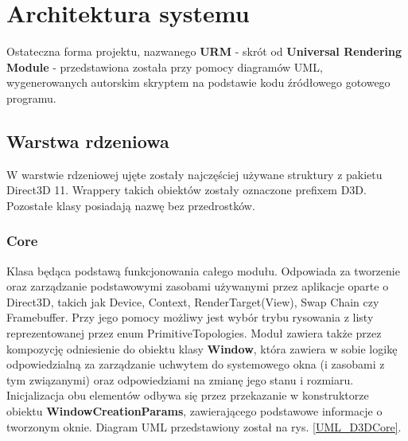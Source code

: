 \chapter{Architektura systemu}
\label{chapter_System_Architecture}
	Ostateczna forma projektu, nazwanego \textbf{URM} - skrót od \textbf{Universal Rendering Module} - przedstawiona została przy pomocy diagramów UML, wygenerowanych autorskim skryptem na podstawie kodu źródłowego gotowego programu.

\section{Warstwa rdzeniowa}
	W warstwie rdzeniowej ujęte zostały najczęściej używane struktury z pakietu Direct3D 11. Wrappery takich obiektów zostały oznaczone prefixem D3D. Pozostałe klasy posiadają nazwę bez przedrostków.

\subsection{Core}
	Klasa będąca podstawą funkcjonowania całego modułu. 
	Odpowiada za tworzenie oraz zarządzanie podstawowymi zasobami używanymi przez aplikacje oparte o Direct3D, takich jak Device, Context, RenderTarget(View), Swap Chain czy Framebuffer. Przy jego pomocy możliwy jest wybór trybu rysowania z listy reprezentowanej przez enum PrimitiveTopologies.
	Moduł zawiera także przez kompozycję odniesienie do obiektu klasy \textbf{Window}, która zawiera w sobie logikę odpowiedzialną za zarządzanie uchwytem do systemowego okna (i zasobami z tym związanymi) oraz odpowiedziami na zmianę jego stanu i rozmiaru.
	Inicjalizacja obu elementów odbywa się przez przekazanie w konstruktorze obiektu \textbf{WindowCreationParams}, zawierającego podstawowe informacje o tworzonym oknie.
	Diagram UML przedstawiony został na rys. \ref{UML_D3DCore}.
	
	\vfill
	\clearpage
	
